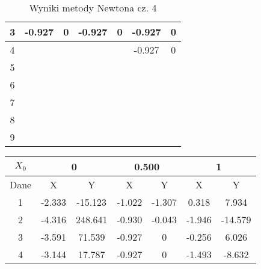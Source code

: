 \documentclass[a4paper, 11pt]{article}
\begin{document}
\begin{enumerate}
\begin{itemize}
\begin{table}[p]
\begin{tabular}{|c|c|c|c|c|c|c|}
\hline                                                        
3  & -0.927 & 0 & -0.927 & 0 & -0.927 & 0 \\
\hline                                                        
4  &  &  &  &  & -0.927 &  0\\    
\hline                                                        
5  &  &  &  &  &  &  \\      
\hline                                                        
6  &  &  &  &  &  &  \\      
\hline                                                        
7  &  &  &  &  &  &  \\      
\hline                                                        
8  &  &  &  &  &  &  \\      
\hline                                                        
9  &  &  &  &  &  &  \\      
\hline                                                        
\end{tabular}                                                 
\caption{Wyniki metody Newtona cz. 4}                         
\label{table:Wyniki metody Newtona cz. 4}                     
\end{table}                                                   
\begin{table}[p]                                                   
\centering                                                      
\begin{tabular}{|c|c|c|c|c|c|c|}                                
\hline                                                          
\( X_0 \)  & \multicolumn{2}{c|}{0 } & \multicolumn{2}{c|}{0.500} & \multicolumn{2}{c|}{ 1  } \\       
\hline                                                          
Dane & X & Y & X & Y & X & Y \\                                
\hline                                                          
1  & -2.333 & -15.123 & -1.022 & -1.307 & 0.318 & 7.934 \\   
\hline                                                          
2  & -4.316 & 248.641 & -0.930 & -0.043 & -1.946 & -14.579 \\
\hline                                                          
3  & -3.591 & 71.539 & -0.927 &  0 & -0.256 & 6.026 \\   
\hline                                                          
4  & -3.144 & 17.787 & -0.927 & 0 & -1.493 & -8.632 \\  

\end{tabular}
\end{table}
\end{itemize}
\end{enumerate}
\end{document}
